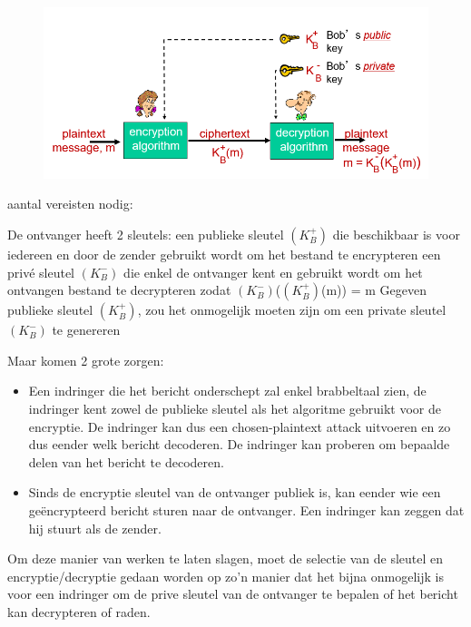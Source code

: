 \begin{figure}[h]
    \centering
    \includegraphics[width=7in]{./img/imghfdst8/hfdst8puntje5.png}\\[1cm]
    \caption{ }      
    \label{fig: }
\end{figure}

\noindent aantal vereisten nodig:

\be
\itf De ontvanger heeft 2 sleutels:
    \be
    \itf een publieke sleutel $(K^+_B)$ die beschikbaar is voor iedereen en door de zender gebruikt wordt om het bestand te encrypteren
    \itf een privé sleutel $(K^-_B)$ die enkel de ontvanger kent en gebruikt wordt om het ontvangen bestand te decrypteren
   \itf zodat $(K^-_B)$($(K^+_B)$(m)) = m
    \ee
\itf Gegeven publieke sleutel $(K^+_B)$, zou het onmogelijk moeten zijn om een private sleutel $(K^-_B)$ te genereren
\ee

Maar komen 2 grote zorgen:
\begin{itemize}
\item Een indringer die het bericht onderschept zal enkel brabbeltaal zien, de indringer kent zowel de publieke sleutel als het algoritme gebruikt voor de encryptie. De indringer kan dus een chosen-plaintext attack uitvoeren en zo dus eender welk bericht decoderen. De indringer kan proberen om bepaalde delen van het bericht te decoderen.
\item Sinds de encryptie sleutel van de ontvanger publiek is, kan eender wie een geëncrypteerd bericht sturen naar de ontvanger. Een indringer kan zeggen dat hij stuurt als de zender.

\end{itemize}

\noindent Om deze manier van werken te laten slagen, moet de selectie van de sleutel en encryptie/decryptie gedaan worden op zo’n manier dat het bijna onmogelijk is voor een indringer om de prive sleutel van de ontvanger te bepalen of het bericht kan decrypteren of raden.

